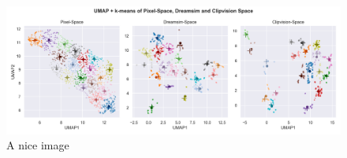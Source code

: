 \begin{figure}[ht]
    \centering
    \includegraphics[width=1\textwidth]{plots/dropout_umap.png}
    \caption{A nice image}\label{fig:dropout_umap}
\end{figure}




